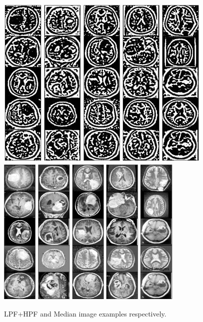 \documentclass[conference]{IEEEtran}
\begin{document}
\begin{figure}[h]
\centering
\includegraphics[scale=0.40]{figures/lpf_hpf.JPG}
\includegraphics[scale=0.46]{figures/median.JPG}
\caption{LPF+HPF and Median image examples respectively.}
\end{figure}
\end{document}
